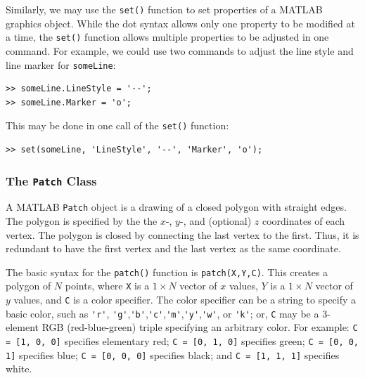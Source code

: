Similarly, we may use the \texttt{set()} function to set properties of a MATLAB graphics object. While the dot syntax allows only one property to be modified at a time, the \texttt{set()} function allows multiple properties to be adjusted in one command. For example, we could use two commands to adjust the line style and line marker for \texttt{someLine}:
\begin{lstlisting}[style=Matlab-editor]
>> someLine.LineStyle = '--';
>> someLine.Marker = 'o';
\end{lstlisting}
This may be done in one call of the \texttt{set()} function:
\begin{lstlisting}[style=Matlab-editor]
>> set(someLine, 'LineStyle', '--', 'Marker', 'o');
\end{lstlisting}


\subsubsection{The \texttt{Patch} Class}

A MATLAB \texttt{Patch} object is a drawing of a closed polygon with straight edges. The polygon is specified by the the $x$-, $y$-, and (optional) $z$ coordinates of each vertex. The polygon is closed by connecting the last vertex to the first. Thus, it is redundant to have the first vertex and the last vertex as the same coordinate.

The basic syntax for the \texttt{patch()} function is \texttt{patch(X,Y,C)}. This creates a polygon of $N$ points, where \texttt{X} is a $1\times N$ vector of $x$ values, $Y$ is a $1\times N$ vector of $y$ values, and \texttt{C} is a color specifier. The color specifier can be a string to specify a basic color, such as \verb!'r'!, \verb!'g'!,\verb!'b'!,\verb!'c'!,\verb!'m'!,\verb!'y'!,\verb!'w'!, or \verb!'k'!; or, \texttt{C} may be a $3$-element RGB (red-blue-green) triple specifying an arbitrary color. For example: \verb!C = [1, 0, 0]! specifies elementary red; \verb!C = [0, 1, 0]! specifies green; \verb!C = [0, 0, 1]! specifies blue; \verb!C = [0, 0, 0]! specifies black; and \verb!C = [1, 1, 1]! specifies white.

